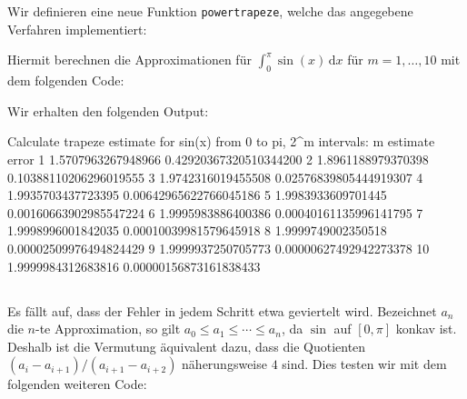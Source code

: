\section{}
\label{section: better trapeze}





\subsection{}

Wir definieren eine neue Funktion \texttt{powertrapeze}, welche das angegebene Verfahren implementiert:



Hiermit berechnen die Approximationen für $\int_0^\pi \sin(x) \,\text{d}x$ für $m = 1, \dotsc, 10$ mit dem folgenden Code:



Wir erhalten den folgenden Output:
\begin{consoleoutput}
Calculate trapeze estimate for sin(x) from 0 to pi, 2^m intervals:
 m      estimate                error
 1      1.5707963267948966      0.42920367320510344200
 2      1.8961188979370398      0.10388110206296019555
 3      1.9742316019455508      0.02576839805444919307
 4      1.9935703437723395      0.00642965622766045186
 5      1.9983933609701445      0.00160663902985547224
 6      1.9995983886400386      0.00040161135996141795
 7      1.9998996001842035      0.00010039981579645918
 8      1.9999749002350518      0.00002509976494824429
 9      1.9999937250705773      0.00000627492942273378
10      1.9999984312683816      0.00000156873161838433
\end{consoleoutput}





\subsection{}

Es fällt auf, dass der Fehler in jedem Schritt etwa geviertelt wird.
Bezeichnet $a_n$ die $n$-te Approximation, so gilt $a_0 \leq a_1 \leq \dotsb \leq a_n$, da $\sin$ auf $[0,\pi]$ konkav ist.
Deshalb ist die Vermutung äquivalent dazu, dass die Quotienten $(a_i - a_{i+1})/(a_{i+1} - a_{i+2})$ näherungsweise $4$ sind.
Dies testen wir mit dem folgenden weiteren Code:

